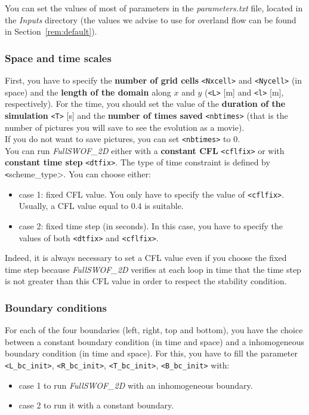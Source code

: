 \documentclass[a4paper, 11pt]{article}
\newcommand{\FullSWOF}{\emph{FullSWOF\_2D}}
\begin{document}
You can set the values of most of parameters in the \textit{parameters.txt} file, located in the \textit{Inputs} directory (the values we advise 
to use for overland flow can be found in Section~\ref{rem:default}).

\subsubsection{Space and time scales}

First, you have to specify the \textbf{number of grid cells} \texttt{<Nxcell>} and \texttt{<Nycell>} (in space) and the \textbf{length of  the domain} along $x$ and $y$ (\texttt{<L>} [m] and \texttt{<l>} [m], respectively).
For the time, you should set the value of the \textbf{duration of the simulation} \texttt{<T>} [s] and the \textbf{number of times saved} \texttt{<nbtimes>}
(that is the number of pictures you will save to see the evolution as a movie). \\
If you do not want to save pictures, you can set \texttt{<nbtimes>} to 0.\\

You can run \FullSWOF{} either with a \textbf{constant CFL} \texttt{<cflfix>} or with \textbf{constant time step} \texttt{<dtfix>}.
The type of time constraint is defined by \texttt<scheme\_type>. You can choose either:
\begin{itemize}
\item case 1: fixed CFL value. You only have to specify the value of \texttt{<cflfix>}. Usually, a CFL value equal to 0.4 is suitable.
\item case 2: fixed time step (in seconds). In this case, you have to specify the values of both \texttt{<dtfix>} and \texttt{<cflfix>}.
\end{itemize}
Indeed, it is always necessary to set a CFL value even if you choose the fixed time step because \FullSWOF{} verifies at each loop in time that the time step is not greater than this CFL value in order to respect the stability condition.
% 
\subsubsection{Boundary conditions}
For each of the four boundaries (left, right, top and bottom), you have the choice between a constant boundary condition (in time and space) and a inhomogeneous boundary condition (in time and space). For this, you have to fill the parameter \texttt{<L\_bc\_init>}, \texttt{<R\_bc\_init>}, \texttt{<T\_bc\_init>}, \texttt{<B\_bc\_init>} with:
\begin{itemize}
\item case 1 to run \FullSWOF{} with an inhomogeneous boundary.
\item case 2 to run it with a constant boundary.
\end{itemize}
\end{document}
